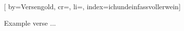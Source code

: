 
[%
    by={Versengold},
    cr={},
    li={},
    index={ichundeinfassvollerwein}]


    \label{ichundeinfassvollerwein}

    \beginverse
        Example verse ...
    \endverse
\endsong
